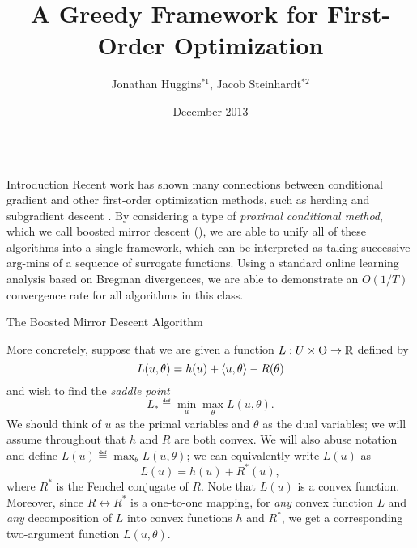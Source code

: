 \documentclass[final]{beamer}
\title%
{A Greedy Framework for First-Order Optimization}
\author%
{Jonathan Huggins$^{*1}$, Jacob Steinhardt$^{*2}$}
\institute[] %
{$^{*}$Both authors contributed equally to this work. $^1$Massachusetts Institute of Technology. $^{2}$Stanford University.}
\date{December 2013}
\begin{document}
\begin{frame}{} 
    \begin{columns}
\begin{column}{0.48\linewidth}


\begin{block}{\large Introduction}
Recent work has shown many connections between conditional gradient 
and other first-order optimization methods, such as herding \cite{Bach:2012a} 
and subgradient descent \cite{Bach:2012b}. By considering a type of 
\emph{proximal conditional method}, which we call boosted mirror 
descent (\bmd), we are able to unify all of these algorithms into 
a single framework, which can be interpreted as taking successive 
arg-mins of a sequence of surrogate functions. Using a standard 
online learning analysis based on Bregman divergences, we are 
able to demonstrate an $O(1/T)$ convergence rate for all algorithms 
in this class. 
\end{block}

\begin{block}{\large The Boosted Mirror Descent Algorithm}

More concretely, suppose that we are given a function 
$L : U \times \Theta \to \mathbb{R}$ defined by
\[ L(u, \theta) = h(u) + \left\langle u, \theta \right\rangle - R(\theta) \]
and wish to find the \emph{saddle point} 
\[ L_* \eqdef \min_{u} \max_{\theta} L(u, \theta). \]
We should think of $u$ as the primal variables and $\theta$ 
as the dual variables; we will assume throughout that 
$h$ and $R$ are both convex. We will also abuse notation 
and define $L(u) \eqdef \max_{\theta} L(u, \theta)$; we 
can equivalently write $L(u)$ as 
\[ L(u) = h(u) + R^*(u), \]
where $R^*$ is the Fenchel conjugate of $R$. Note that 
$L(u)$ is a convex function. Moreover, since 
$R \leftrightarrow R^*$ is a one-to-one mapping, for 
\emph{any} convex function $L$ and \emph{any} decomposition 
of $L$ into convex functions $h$ and $R^*$, we get a 
corresponding two-argument function $L(u, \theta)$. 


\end{block}
\end{column}
\end{columns}
\end{frame}
\end{document}
